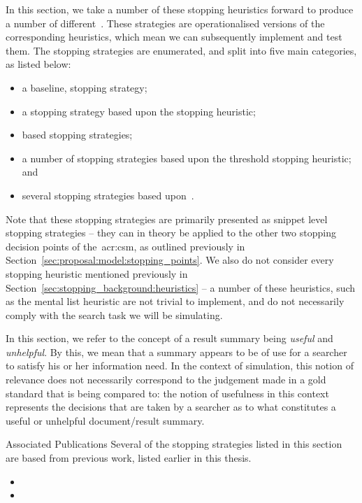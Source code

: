 In this section, we take a number of these stopping heuristics forward to produce a number of different~. These strategies are operationalised versions of the corresponding heuristics, which mean we can subsequently implement and test them. The stopping strategies are enumerated, and split into five main categories, as listed below:

\begin{itemize}
    \item{a baseline,  stopping strategy;}
    \item{a stopping strategy based upon the  stopping heuristic;}
    \item{ based stopping strategies;}
    \item{a number of stopping strategies based upon the  threshold stopping heuristic; and}
    \item{several stopping strategies based upon~.}
\end{itemize}

Note that these stopping strategies are primarily presented as snippet level stopping strategies -- they can in theory be applied to the other two stopping decision points of the~\gls{acr:csm}, as outlined previously in Section~\ref{sec:proposal:model:stopping_points}. We also do not consider every stopping heuristic mentioned previously in Section~\ref{sec:stopping_background:heuristics} -- a number of these heuristics, such as the mental list heuristic are not trivial to implement, and do not necessarily comply with the search task we will be simulating.

\noindent{} In this section, we refer to the concept of a result summary being \emph{useful} and \emph{unhelpful}. By this, we mean that a summary appears to be of use for a searcher to satisfy his or her information need. In the context of simulation, this notion of relevance does not necessarily correspond to the judgement made in a gold standard that is being compared to: the notion of usefulness in this context represents the decisions that are taken by a searcher as to what constitutes a useful or unhelpful document/result summary.

\vspace*{5mm}
\begin{publications_box}{Associated Publications}
Several of the stopping strategies listed in this section are based from previous work, listed earlier in this thesis.
\vspace*{-3mm}
\begin{itemize}
    \item{}
    \item{}
\end{itemize}
\end{publications_box}


